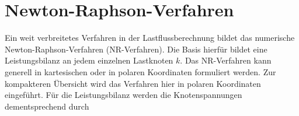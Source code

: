 











\section{Newton-Raphson-Verfahren}
\label{sec:nr}

Ein weit verbreitetes Verfahren in der Lastflussberechnung bildet das numerische Newton-Raphson-Verfahren (NR-Verfahren).
Die Basis hierfür bildet eine Leistungsbilanz an jedem einzelnen Lastknoten $k$. 
Das NR-Verfahren kann generell in kartesischen oder in polaren Koordinaten formuliert werden.
Zur kompakteren Übersicht wird das Verfahren hier in polaren Koordinaten eingeführt.
Für die Leistungsbilanz werden die Knotenspannungen dementsprechend durch


